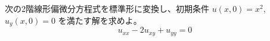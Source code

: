 
次の2階線形偏微分方程式を標準形に変換し、初期条件 $u(x,0) = x^{2}$, $u_{y}(x,0) = 0$ を満たす解を求めよ。
\[
u_{xx} - 2u_{xy} + u_{yy} = 0
\]
